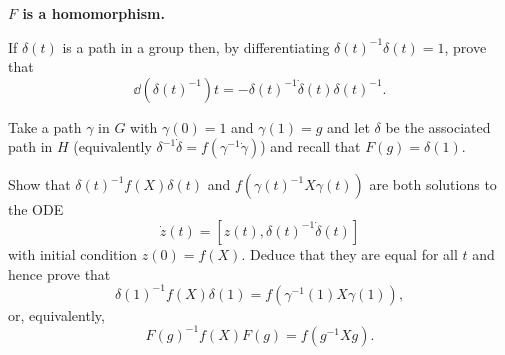 \documentclass[12pt]{article}
\begin{document}
\iffalse
\begin{answer}
\begin{enumerate}[(a)]
\item
By the Maurer-Cartan theorem, the existence of $\psi$ implies that if
\[\pd{\psi}{s}(s,t)=\psi(s,t)\xi(s,t),\quad\pd{\psi}{t}(s,t)=\psi(s,t)\eta(s,t)\]
then $\xi$ and $\eta$ solve the Maurer-Cartan equation.
\item If $f$ is a Lie algebra homomorphism then
\[\pd{f\xi}{t}-\pd{f\eta}{s}=f\left(\pd{\xi}{t}-\pd{\eta}{s}\right)=f[\xi,\eta]=[f\xi,f\eta].\]
so $f\xi$ and $f\eta$ satisfy the Maurer-Cartan equation.
\item By the Maurer-Cartan theorem if $f\xi$ and $f\eta$ satisfy the Maurer-Cartan equation then the existence of such a $\phi$ follows.
\item Since $\psi(s,1)=g$ we have $\xi(s,1)=\pd{\psi}{s}(s,1)=0$. Hence $f\xi(s,1)=0$ and hence $\pd{\phi}{s}(s,1)=\phi(s,1)f\xi(s,1)=0$ and so $\phi(s,1)$ is independent of $s$. Since $\delta_i$ is the associated path to $\gamma_i$ ($i=0,1$) it is equal to $\psi(i,t)$ and therefore we have proved that $\delta_0(1)=\delta_1(1)$.
\end{enumerate}
\end{answer}
\fi

\newpage

{\bf $F$ is a homomorphism.}

\begin{question}
If $\delta(t)$ is a path in a group then, by differentiating $\delta(t)^{-1}\delta(t)=1$, prove that
\[\dd{(\delta(t)^{-1})}{t}=-\delta(t)^{-1}\dot{\delta}(t)\delta(t)^{-1}.\]
\end{question}

\iffalse
\begin{answer}
Differentiating $\delta(t)^{-1}\delta(t)=1$ with respect to $t$ gives
\[\dd{\delta^{-1}}{t}(t)\delta(t)=-\delta(t)^{-1}\dd{\delta}{t}(t)\]
so
\[\dd{\delta^{-1}}{t}(t)=-\delta(t)^{-1}\dd{\delta}{t}(t)\delta(t)^{-1}.\]
\end{answer}
\fi

Take a path $\gamma$ in $G$ with $\gamma(0)=1$ and $\gamma(1)=g$ and let $\delta$ be the associated path in $H$ (equivalently $\delta^{-1}\dot{\delta}=f(\gamma^{-1}\dot{\gamma})$) and recall that $F(g)=\delta(1)$.

\begin{question}\label{qun:intertwined}
Show that $\delta(t)^{-1}f(X)\delta(t)$ and $f(\gamma(t)^{-1}X\gamma(t))$ are both solutions to the ODE
\[\dot{z}(t)=[z(t),\delta(t)^{-1}\dot{\delta}(t)]\]
with initial condition $z(0)=f(X)$. Deduce that they are equal for all $t$ and hence prove that
\[\delta(1)^{-1}f(X)\delta(1)=f(\gamma^{-1}(1)X\gamma(1)),\]
or, equivalently,
\[F(g)^{-1}f(X)F(g)=f(g^{-1}Xg).\]
\end{question}
\end{document}

